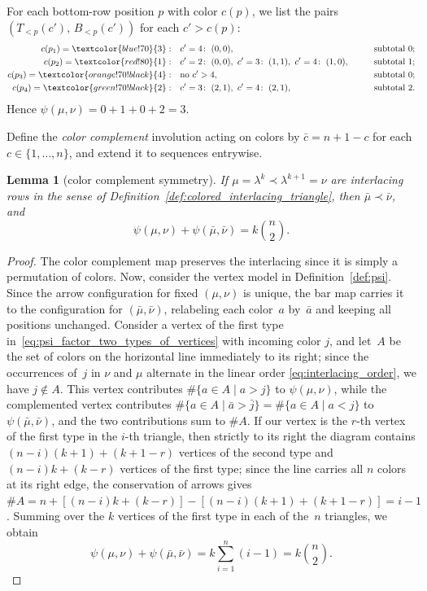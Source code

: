 \documentclass[10pt,a4paper]{amsart}
\numberwithin{equation}{section}
\newtheorem{Lemma}[Theorem]{Lemma}
\theoremstyle{definition}
\begin{document}
For each bottom-row position $p$ with color $c(p)$, we list the pairs
$(T_{<p}(c'),\, B_{<p}(c'))$ for each $c'>c(p)$:
\begin{alignat*}
	{2} c(p_1)=\textcolor{blue!70}{3}:     &\quad c'=4\colon\;(0,0),                                              &\qquad & \text{subtotal } 0;\\
	c(p_2)=\textcolor{red!80}{1}:          &\quad c'=2\colon\;(0,0),\  c'=3\colon\;(1,1),\
	c'=4\colon\;(1,0), &       & \text{subtotal } 1;\\
	c(p_3)=\textcolor{orange!70!black}{4}: &\quad \text{no }c'>4,                                                 &       & \text{subtotal } 0;\\
	c(p_4)=\textcolor{green!70!black}{2}:  &\quad c'=3\colon\;(2,1),\
	c'=4\colon\;(2,1),                      &       & \text{subtotal } 2.
\end{alignat*}
Hence $\psi(\mu,\nu) = 0+1+0+2 = 3$.

Define the \emph{color complement} involution acting on colors by
$\bar{c} = n+1-c$ for each $c \in \{1,\dots,n\}$, and extend it to sequences
entrywise.

\begin{Lemma}[color complement symmetry]
	\label{lem:color_complement} If $\mu = \lambda^k \prec \lambda^{k+1} = \nu$
	are interlacing rows in the sense of
	Definition~{\rm \ref{def:colored_interlacing_triangle}}, then $\bar{\mu} \prec \bar{\nu}$,
	and
	\[ \psi(\mu, \nu) + \psi(\bar{\mu}, \bar{\nu}) =
		k\binom{n}{2}.
	\]
\end{Lemma}
\begin{proof}
	The color complement map preserves the interlacing since it is simply a
	permutation of colors.
	Now, consider the vertex model in Definition~\ref{def:psi}.
	Since the arrow configuration for fixed $(\mu,\nu)$ is unique, the bar map
	carries it to the configuration for $(\bar{\mu},\bar{\nu})$, relabeling
	each color~$a$ by~$\bar{a}$ and keeping all positions unchanged.
	Consider a vertex of the first type in~\eqref{eq:psi_factor_two_types_of_vertices} with incoming color $j$, and
	let~$A$ be the set of colors on the horizontal line immediately to its
	right; since the occurrences of~$j$ in $\nu$ and $\mu$ alternate in the
	linear order \eqref{eq:interlacing_order}, we have $j\notin A$.
	This vertex contributes $\# \{ a\in A\mid a>j \}$ to
	$\psi(\mu,\nu)$, while the complemented vertex contributes
	$\# \{ a\in A \mid \bar{a}>\bar{j}  \}
	=\# \{ a\in A\mid a<j  \}$ to $\psi(\bar{\mu},\bar{\nu})$, and the
	two contributions sum to $\#A$.
	If our vertex is the $r$-th vertex of the first type in the $i$-th
	triangle, then strictly to its right the diagram contains
	$(n-i)(k+1)+(k+1-r)$ vertices of the second type and $(n-i)k+(k-r)$
	vertices of the first type; since the line carries all $n$ colors at its
	right edge, the conservation of arrows gives
	$\#A=n+[(n-i)k+(k-r)]-[(n-i)(k+1)+(k+1-r)]=i-1$.
	Summing over the $k$ vertices of the first type in each of the~$n$
	triangles, we obtain
\[
\psi(\mu, \nu) + \psi(\bar{\mu}, \bar{\nu})
	=k\sum_{i=1}^{n}(i-1)= k\binom{n}{2}.\tag*{\qed}
\]\renewcommand{\qed}{}
\end{proof}
\end{document}
